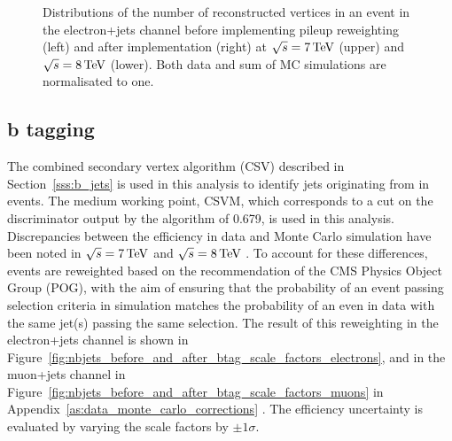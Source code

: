 \begin{figure}[hbtp]
     \caption{Distributions of the number of reconstructed vertices in an event in the electron+jets channel
     before implementing pileup reweighting (left) and after implementation (right) at $\sqrt{s}=7\,\text{Te\hspace{-.08em}V}$ (upper)
     and $\sqrt{s}=8\,\text{Te\hspace{-.08em}V}$ (lower). Both data and sum of MC simulations are normalisated to one.}
     \label{fig:nvertices_before_and_after_pileup_reweighting_electrons}
\end{figure}

\subsection{b tagging}
\label{ss:b_tagging}
The combined secondary vertex \btagging algorithm (CSV) described in Section~\ref{sss:b_jets} is used in this
analysis to identify jets originating from \bquarks in \ttbar events. The medium working point, CSVM, which
corresponds to a cut on the discriminator output by the algorithm of 0.679, is used in this analysis.
Discrepancies between the \btagging efficiency in data and Monte Carlo simulation have been noted in
$\sqrt{s}=7\,\text{Te\hspace{-.08em}V}$ \cite{CMS-PAS-BTV-11-004} and $\sqrt{s}=8\,\text{Te\hspace{-.08em}V}$ \cite{CMS-DP-2013-005}. To account for these
differences, events are reweighted based on the recommendation of the CMS \btagging Physics Object Group
(POG), with the aim of ensuring that the probability of an event passing selection criteria in simulation
matches the probability of an even in data with the same jet(s) passing the same selection. The result of this
reweighting in the electron+jets channel is shown in
Figure~\ref{fig:nbjets_before_and_after_btag_scale_factors_electrons}, and in the muon+jets channel in
Figure~\ref{fig:nbjets_before_and_after_btag_scale_factors_muons} in
Appendix~\ref{as:data_monte_carlo_corrections} .
The \btagging efficiency uncertainty is evaluated by varying the scale factors by $\pm1\sigma$.

